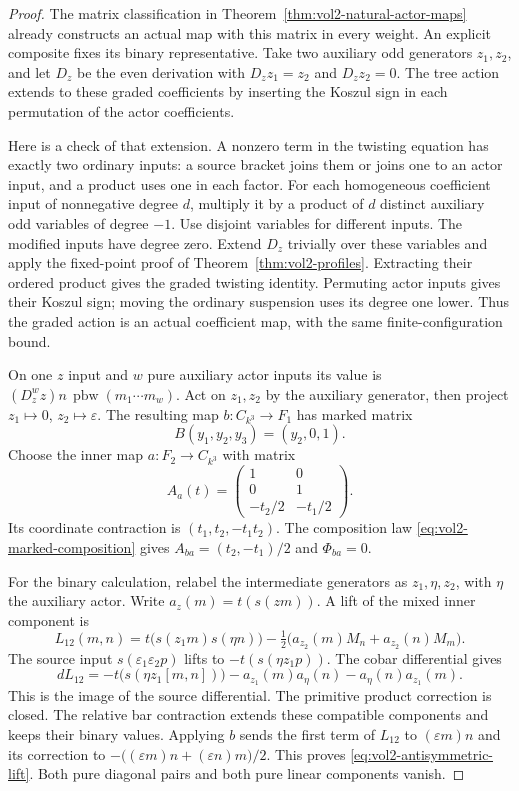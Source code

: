 \begin{proof}
The matrix classification in
Theorem~\ref{thm:vol2-natural-actor-maps} already constructs an
actual map with this matrix in every weight.
An explicit composite fixes its binary representative.
Take two auxiliary odd generators $z_1,z_2$, and let $D_z$ be the
even derivation with $D_zz_1=z_2$ and $D_zz_2=0$.
The tree action extends to these graded coefficients by inserting
the Koszul sign in each permutation of the actor coefficients.

Here is a check of that extension. A nonzero term in the twisting
equation has exactly two ordinary inputs: a source bracket joins
them or joins one to an actor input, and a product uses one in each
factor. For each homogeneous coefficient input of nonnegative
degree $d$, multiply it by a product of $d$ distinct auxiliary
odd variables of degree $-1$. Use disjoint variables for different
inputs. The modified inputs have degree zero.
Extend $D_z$ trivially over these variables and apply the
fixed-point proof of Theorem~\ref{thm:vol2-profiles}.
Extracting their ordered product gives the graded twisting
identity. Permuting actor inputs gives their Koszul sign; moving
the ordinary suspension uses its degree one lower.
Thus the graded action is an actual coefficient map, with the
same finite-configuration bound.

On one $z$ input and $w$ pure auxiliary actor inputs its value is
$(D_z^wz)n\,\operatorname{pbw}(m_1\cdots m_w)$.
Act on $z_1,z_2$ by the auxiliary generator, then project
$z_1\mapsto0$, $z_2\mapsto\varepsilon$.
The resulting map $b:C_{k^3}\to F_1$ has marked matrix
\[
 B(y_1,y_2,y_3)=(y_2,0,1).
\]
Choose the inner map $a:F_2\to C_{k^3}$ with matrix
\[
 A_a(t)=
 \begin{pmatrix}
  1&0\\0&1\\-t_2/2&-t_1/2
 \end{pmatrix}.
\]
Its coordinate contraction is
$(t_1,t_2,-t_1t_2)$.
The composition law \eqref{eq:vol2-marked-composition}
gives $A_{ba}=(t_2,-t_1)/2$ and $\Phi_{ba}=0$.

For the binary calculation, relabel the intermediate generators
as $z_1,\eta,z_2$, with $\eta$ the auxiliary actor.
Write $a_z(m)=t(s(zm))$.
A lift of the mixed inner component is
\[
 L_{12}(m,n)=t\bigl(s(z_1m)s(\eta n)\bigr)
 -\tfrac12\bigl(a_{z_2}(m)M_n+a_{z_2}(n)M_m\bigr).
\]
The source input $s(\varepsilon_1\varepsilon_2p)$ lifts to
$-t(s(\eta z_1p))$. The cobar differential gives
\[
 dL_{12}
 =-t\bigl(s(\eta z_1[m,n])\bigr)
       -a_{z_1}(m)a_\eta(n)-a_\eta(n)a_{z_1}(m).
\]
This is the image of the source differential.
The primitive product correction is closed.
The relative bar contraction extends these compatible components
and keeps their binary values.
Applying $b$ sends the first term of $L_{12}$ to
$(\varepsilon m)n$ and its correction to
$-\bigl((\varepsilon m)n+(\varepsilon n)m\bigr)/2$.
This proves \eqref{eq:vol2-antisymmetric-lift}.
Both pure diagonal pairs and both pure linear components vanish.


\end{proof}
